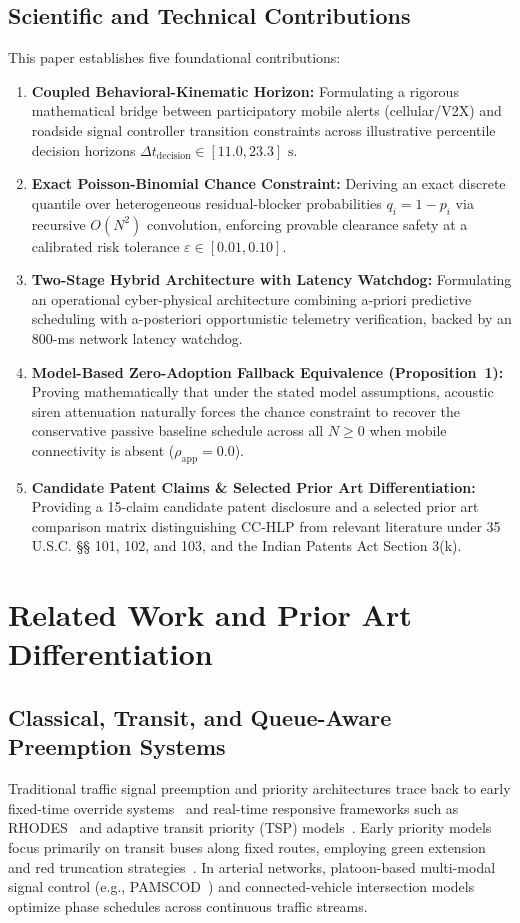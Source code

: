 \documentclass[journal,10pt,twocolumn]{IEEEtran}
\begin{document}
\subsection{Scientific and Technical Contributions}
This paper establishes five foundational contributions:
\begin{enumerate}
    \item \textbf{Coupled Behavioral-Kinematic Horizon:} Formulating a rigorous mathematical bridge between participatory mobile alerts (cellular/V2X) and roadside signal controller transition constraints across illustrative percentile decision horizons $\Delta t_{\text{decision}} \in [11.0, 23.3]\text{ s}$.
    \item \textbf{Exact Poisson-Binomial Chance Constraint:} Deriving an exact discrete quantile over heterogeneous residual-blocker probabilities $q_i = 1 - p_i$ via recursive $O(N^2)$ convolution, enforcing provable clearance safety at a calibrated risk tolerance $\varepsilon \in [0.01, 0.10]$.
    \item \textbf{Two-Stage Hybrid Architecture with Latency Watchdog:} Formulating an operational cyber-physical architecture combining a-priori predictive scheduling with a-posteriori opportunistic telemetry verification, backed by an 800-ms network latency watchdog.
    \item \textbf{Model-Based Zero-Adoption Fallback Equivalence (Proposition~1):} Proving mathematically that under the stated model assumptions, acoustic siren attenuation naturally forces the chance constraint to recover the conservative passive baseline schedule across all $N \ge 0$ when mobile connectivity is absent ($\rho_{\text{app}} = 0.0$).
    \item \textbf{Candidate Patent Claims \& Selected Prior Art Differentiation:} Providing a 15-claim candidate patent disclosure and a selected prior art comparison matrix distinguishing CC-HLP from relevant literature under 35 U.S.C. §§ 101, 102, and 103, and the Indian Patents Act Section 3(k).
\end{enumerate}

\section{Related Work and Prior Art Differentiation}

\subsection{Classical, Transit, and Queue-Aware Preemption Systems}
Traditional traffic signal preemption and priority architectures trace back to early fixed-time override systems~\cite{skabardonis2000} and real-time responsive frameworks such as RHODES~\cite{mirchandani2001} and adaptive transit priority (TSP) models~\cite{dion2005,hu2013transit}. Early priority models focus primarily on transit buses along fixed routes, employing green extension and red truncation strategies~\cite{christofa2011,ma2013dynamic}. In arterial networks, platoon-based multi-modal signal control (e.g., PAMSCOD~\cite{he2014pam}) and connected-vehicle intersection models~\cite{guler2014} optimize phase schedules across continuous traffic streams.
\end{document}
